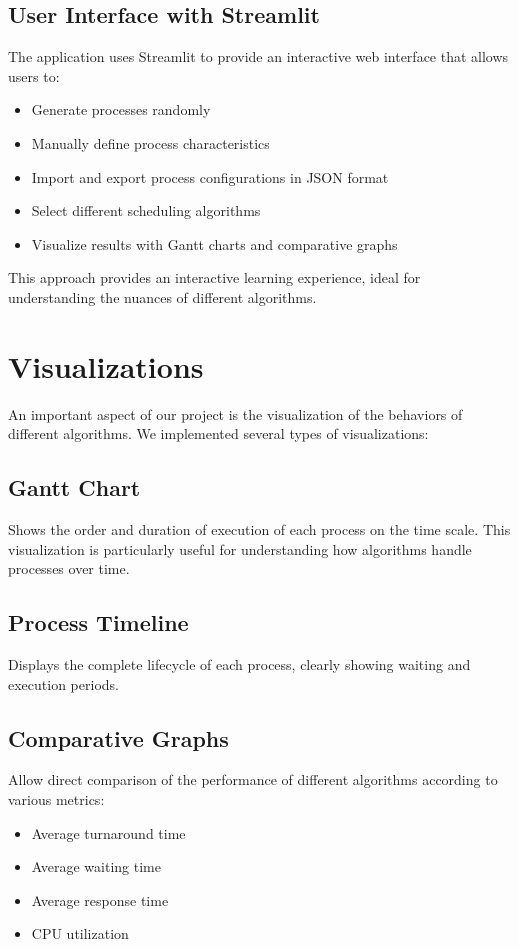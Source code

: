 \documentclass[12pt,a4paper]{article}
\begin{document}
\subsection{User Interface with Streamlit}
The application uses Streamlit to provide an interactive web interface that allows users to:
\begin{itemize}
    \item Generate processes randomly
    \item Manually define process characteristics
    \item Import and export process configurations in JSON format
    \item Select different scheduling algorithms
    \item Visualize results with Gantt charts and comparative graphs
\end{itemize}

This approach provides an interactive learning experience, ideal for understanding the nuances of different algorithms.

\section{Visualizations}
An important aspect of our project is the visualization of the behaviors of different algorithms. We implemented several types of visualizations:

\subsection{Gantt Chart}
Shows the order and duration of execution of each process on the time scale. This visualization is particularly useful for understanding how algorithms handle processes over time.

\subsection{Process Timeline}
Displays the complete lifecycle of each process, clearly showing waiting and execution periods.

\subsection{Comparative Graphs}
Allow direct comparison of the performance of different algorithms according to various metrics:
\begin{itemize}
    \item Average turnaround time
    \item Average waiting time
    \item Average response time
    \item CPU utilization
\end{itemize}
\end{document}
